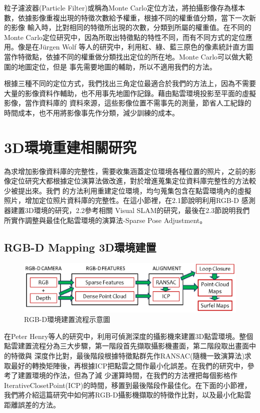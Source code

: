 	粒子濾波器(Particle Filter)或稱為Monte Carlo定位方法，將拍攝影像存為樣本數，依據影像重複出現的特徵次數給予權重，根據不同的權重值分類，當下一次新的影像
輸入時，比對相同的特徵所出現的次數，分類到所屬的權重值。在不同的Monte Carlo定位研究中，因為所取出特徵點的特性不同，而有不同方式的定位應用。像是在Jürgen Wolf
等人的研究中\cite{Wolf2005}，利用紅、綠、藍三原色的像素統計直方圖當作特徵點，依據不同的權重做分類找出定位的所在地。Monte Carlo可以做大範圍的地圖定位，但是
事先需要地圖的輔助，所以不適用我們的方法。

	根據三種不同的定位方式，我們找出三角定位最適合於我們的方法上，因為不需要大量的影像資料作輔助，也不用事先地圖作記錄。藉由點雲環境投影至平面的虛擬影像，當作資料庫的
資料來源，這些影像位置不需事先的測量，節省人工紀錄的時間成本，也不用將影像事先作分類，減少訓練的成本。
	
\section{3D環境重建相關研究}

	為求增加影像資料庫的完整性，需要收集涵蓋定位環境各種位置的照片，之前的影像定位研究大都根據定位演算法做改進，對於增進蒐集定位資料庫完整性的方法較少被提出來。我們
的方法利用重建定位環境，均勻蒐集包含在點雲環境內的虛擬照片，增加定位照片資料庫的完整性。在這小節裡，在2.1節說明利用RGB-D 感測器建置3D環境的研究，2.2參考相關
Visual SLAM的研究，最後在2.3節說明我們所實作調整與最佳化點雲環境的演算法-Sparse Pose Adjustment。
	
\subsection{RGB-D Mapping 3D環境建置}
			
\begin{figure}
\begin{center}
  \includegraphics[width=1.0\textwidth]{figures/RGB-D_System_Overview.eps}
  \caption{\cite{Henry2012}RGB-D環境建置流程示意圖}
  \label{fig:RGB-D System}
\end{center}
\end{figure}  
							
	 在Peter Henry等人\cite{Henry2012}的研究中，利用可偵測深度的攝影機來建置3D點雲環境。整個點雲建置流程分為三大步驟，第一階段首先擷取攝影機畫面，第二階段取出畫面中的特徵與
深度作比對，最後階段根據特徵點群先作RANSAC(隨機一致演算法)求取最好的轉換矩陣後，再根據ICP把點雲之間作最小化誤差。在我們的研究中，參考了\cite{Henry2012}建置環境的作法，但為了減
少運算時間，在我們的方法裡把每個影格作IterativeClosetPoint(ICP)的時間，移置到最後階段作最佳化。在下面的小節裡，我們將介紹這篇研究中如何將RGB-D攝影機擷取的特徵作比對，以及最小化點雲
距離誤差的方法。

